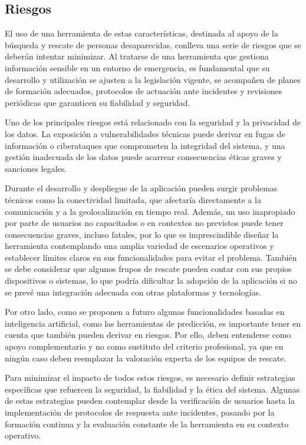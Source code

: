     
    \subsection{Riesgos}
    
    El uso de una herramienta de estas características, destinada al apoyo de la búsqueda y rescate de personas desaparecidas, conlleva una serie de riesgos que se deberán intentar minimizar. Al tratarse de una herramienta que gestiona información sensible en un entorno de emergencia, es fundamental que su desarrollo y utilización se ajusten a la legislación vigente, se acompañen de planes de formación adecuados, protocolos de actuación ante incidentes y revisiones periódicas que garanticen su fiabilidad y seguridad.

    Uno de los principales riesgos está relacionado con la seguridad y la privacidad de los datos. La exposición a vulnerabilidades técnicas puede derivar en fugas de información o ciberataques que comprometen la integridad del sistema, y una gestión inadecuada de los datos puede acarrear consecuencias éticas graves y sanciones legales.

    Durante el desarrollo y despliegue de la aplicación pueden surgir problemas técnicos como la conectividad limitada, que afectaría directamente a la comunicación y a la geolocalización en tiempo real. Además, un uso inapropiado por parte de usuarios no capacitados o en contextos no previstos puede tener consecuencias graves, incluso fatales, por lo que es imprescindible diseñar la herramienta contemplando una amplia variedad de escenarios operativos y establecer límites claros en sus funcionalidades para evitar el problema. También se debe considerar que algunos frupos de rescate pueden contar con sus propios dispositivos o sistemas, lo que podría dificultar la adopción de la aplicación si no se prevé una integración adecuada con otras plataformas y tecnologías.

    Por otro lado, como se proponen a futuro algunas funcionalidades basadas en inteligencia artificial, como las herramientas de predicción, es importante tener en cuenta que también pueden derivar en riesgos. Por ello, deben entenderse como apoyo complementario y no como sustituto del criterio profesional, ya que en ningún caso deben reemplazar la valoración experta de los equipos de rescate.
    
    Para minimizar el impacto de todos estos riesgos, es necesario definir estrategias específicas que refuercen la seguridad, la fiabilidad y la ética del sistema. Algunas de estas estrategias pueden contemplar desde la verificación de usuarios hasta la implementación de protocolos de respuesta ante incidentes, pasando por la formación continua y la evaluación constante de la herramienta en su contexto operativo.

